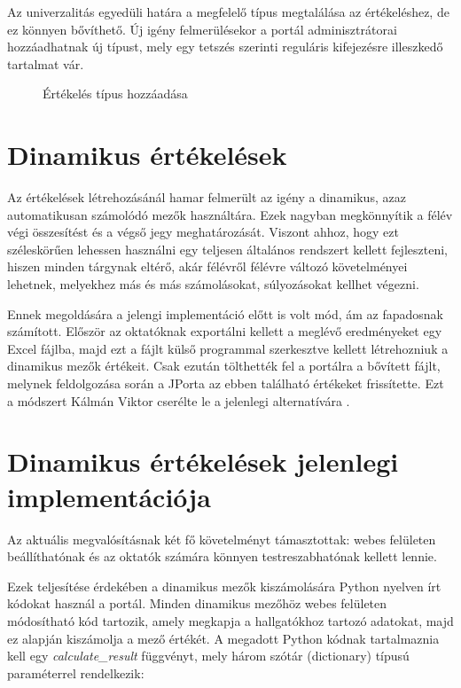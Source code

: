 Az univerzalitás egyedüli határa a megfelelő típus megtalálása az értékeléshez, de ez könnyen bővíthető. Új igény felmerülésekor a portál adminisztrátorai hozzáadhatnak új típust, mely egy tetszés szerinti reguláris kifejezésre illeszkedő tartalmat vár.

\begin{figure}[p]
    \centering
    \caption{Értékelés típus hozzáadása}
    \label{fig:jporta_add_result}
\end{figure}

\section{Dinamikus értékelések}\label{section:dynamic-assessments}

Az értékelések létrehozásánál hamar felmerült az igény a dinamikus, azaz automatikusan számolódó mezők használtára. Ezek nagyban megkönnyítik a félév végi összesítést és a végső jegy meghatározását. Viszont ahhoz, hogy ezt széleskörűen lehessen használni egy teljesen általános rendszert kellett fejleszteni, hiszen minden tárgynak eltérő, akár félévről félévre változó követelményei lehetnek, melyekhez más és más számolásokat, súlyozásokat kellhet végezni. 

Ennek megoldására a jelengi implementáció előtt is volt mód, ám az fapadosnak számított. Először az oktatóknak exportálni kellett a meglévő eredményeket egy Excel fájlba, majd ezt a fájlt külső programmal szerkesztve kellett létrehozniuk a dinamikus mezők értékeit. Csak ezután tölthették fel a portálra a bővített fájlt, melynek feldolgozása során a JPorta az ebben található értékeket frissítette. Ezt a módszert Kálmán Viktor cserélte le a jelenlegi alternatívára \cite{KalmanMsc}.

\section{Dinamikus értékelések jelenlegi implementációja}
Az aktuális megvalósításnak két fő követelményt támasztottak: webes felületen beállíthatónak és az oktatók számára könnyen testreszabhatónak kellett lennie.

Ezek teljesítése érdekében a dinamikus mezők kiszámolására Python nyelven írt kódokat használ a portál. Minden dinamikus mezőhöz webes felületen módosítható kód tartozik, amely megkapja a hallgatókhoz tartozó adatokat, majd ez alapján kiszámolja a mező értékét. A megadott Python kódnak tartalmaznia kell egy \textit{calculate\_result} függvényt, mely három szótár (dictionary) típusú paraméterrel rendelkezik:

